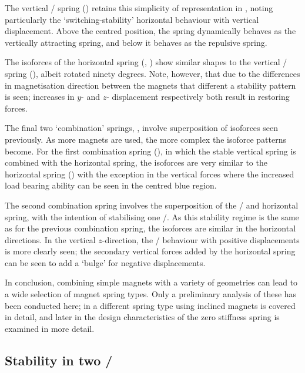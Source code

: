 \documentclass[11pt,a4paper]{memoir}
\begin{document}
The vertical \qzs/ spring () retains this simplicity of representation in , noting particularly the `switching-stability' horizontal behaviour with vertical displacement.
Above the centred position, the spring dynamically behaves as the vertically attracting spring, and below it behaves as the repulsive spring.

The isoforces of the horizontal spring (, ) show similar shapes to the vertical \qzs/ spring (), albeit rotated ninety degrees.
Note, however, that due to the differences in magnetisation direction between the magnets that different a stability pattern is seen; increases in $y$- and $z$- displacement respectively both result in restoring forces.

The final two `combination' springs, , involve superposition of isoforces seen previously.
As more magnets are used, the more complex the isoforce patterns become.
For the first combination spring (), in which the stable vertical spring is combined with the horizontal spring, the isoforces are very similar to the horizontal spring () with the exception in the vertical forces where the increased load bearing ability can be seen in the centred blue region.

The second combination spring involves the superposition of the \qzs/ and horizontal spring, with the intention of stabilising one \dof/.
As this stability regime is the same as for the previous combination spring, the isoforces are similar in the horizontal directions.
In the vertical $z$-direction, the \qzs/ behaviour with positive displacements is more clearly seen; the secondary vertical forces added by the horizontal spring can be seen to add a `bulge' for negative displacements.

In conclusion, combining simple magnets with a variety of geometries can lead to a wide selection of magnet spring types.
Only a preliminary analysis of these has been conducted here; in  a different spring type using inclined magnets is covered in detail, and later in  the design characteristics of the zero stiffness spring is examined in more detail.


\subsection{Stability in two \dof/}
\end{document}
